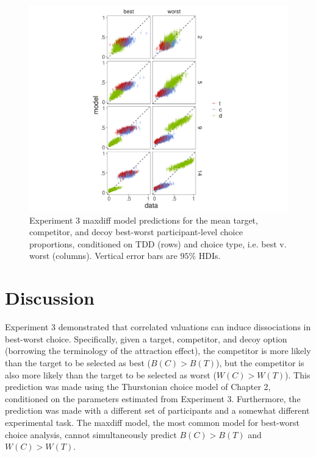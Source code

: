 \begin{figure}
   \centering
   \includegraphics[width=\linewidth]{figures/maxdiff_1_subjectmeans_model_v_data.jpeg}
   \caption{Experiment 3 maxdiff model predictions for the mean target, competitor, and decoy best-worst participant-level choice proportions, conditioned on TDD (rows) and choice type, i.e. best v. worst (columns). Vertical error bars are $95\%$ HDIs.}
   \label{fig:maxdiff_sub_preds}
\end{figure}

\section{Discussion}
Experiment 3 demonstrated that correlated valuations can induce dissociations in best-worst choice. Specifically, given a target, competitor, and decoy option (borrowing the terminology of the attraction effect), the competitor is more likely than the target to be selected as best ($B(C)>B(T)$), but the competitor is also more likely than the target to be selected as worst ($W(C)>W(T)$). This prediction was made using the Thurstonian choice model of Chapter 2, conditioned on the parameters estimated from Experiment 3. Furthermore, the prediction was made with a different set of participants and a somewhat different experimental task. The maxdiff model, the most common model for best-worst choice analysis, cannot simultaneously predict $B(C)>B(T)$ and $W(C)>W(T)$.  


